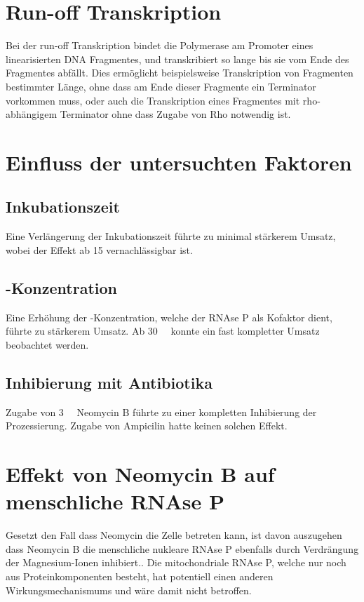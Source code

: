\documentclass[a4paper,english]{scrreprt}
\begin{document}
\section{Run-off Transkription}

Bei der run-off Transkription bindet die Polymerase am Promoter eines
linearisierten DNA Fragmentes, und transkribiert so lange bis sie vom Ende des
Fragmentes abfällt. Dies ermöglicht beispielsweise Transkription von Fragmenten
bestimmter Länge, ohne dass am Ende dieser Fragmente ein Terminator vorkommen
muss, oder auch die Transkription eines Fragmentes mit rho-abhängigem
Terminator ohne dass Zugabe von Rho notwendig ist.

\section{Einfluss der untersuchten Faktoren}

\subsection{Inkubationszeit}

Eine Verlängerung der Inkubationszeit führte zu minimal stärkerem Umsatz, wobei
der Effekt ab \SI{15}{\min} vernachlässigbar ist.

\subsection{-Konzentration}

Eine Erhöhung der -Konzentration, welche der RNAse P als Kofaktor dient,
führte zu stärkerem Umsatz. Ab \SI{30}{\milli\Molar} konnte ein fast kompletter
Umsatz beobachtet werden.

\subsection{Inhibierung mit Antibiotika}

Zugabe von \SI{3}{\milli\Molar} Neomycin B führte zu einer kompletten
Inhibierung der Prozessierung. Zugabe von Ampicilin hatte keinen solchen
Effekt.

\section{Effekt von Neomycin B auf menschliche RNAse P}

Gesetzt den Fall dass Neomycin die Zelle betreten kann, ist davon auszugehen
dass Neomycin B die menschliche nukleare RNAse P ebenfalls durch Verdrängung
der Magnesium-Ionen inhibiert.\cite{inhibition_eukaryotic_rnasep}. Die
mitochondriale RNAse P, welche nur noch aus Proteinkomponenten besteht, hat
potentiell einen anderen Wirkungsmechanismums und wäre damit nicht betroffen.
\end{document}
